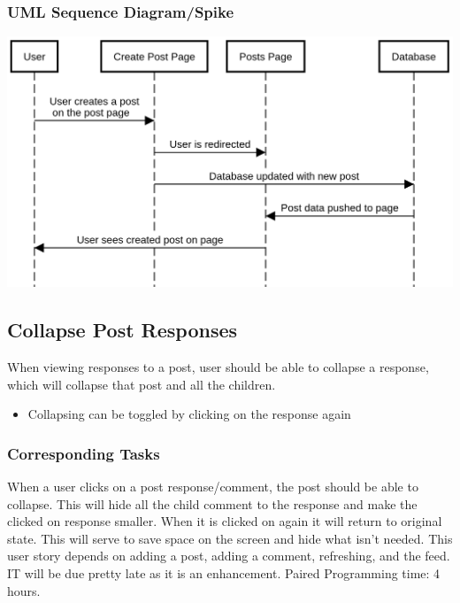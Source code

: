 \documentclass[12pt]{article}
\begin{document}
\subsubsection{UML Sequence Diagram/Spike}
\includegraphics[scale=0.5]{img/view_newly_created_post.png}\linebreak

\subsection{Collapse Post Responses}
When viewing responses to a post, user should be able to collapse a response,
which will collapse that post and all the children.
\begin{itemize}
  \item Collapsing can be toggled by clicking on the response again
\end{itemize}
\subsubsection{Corresponding Tasks}
	When a user clicks on a post response/comment, the post should be able to collapse.  This will hide all the child comment to the response and make the clicked on response smaller.  When it is clicked on again it will return to original state.  This will serve to save space on the screen and hide what isn’t needed.  This user story depends on adding a post, adding a comment, refreshing, and the feed.  IT will be due pretty late as it is an enhancement.  Paired Programming time: 4 hours.
\end{document}

